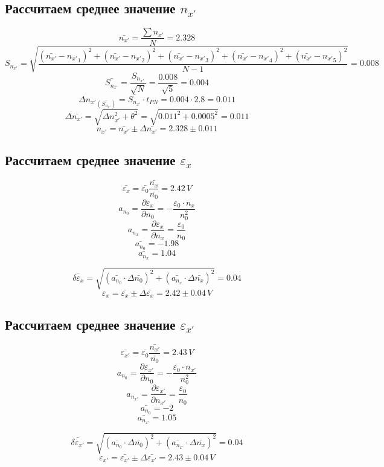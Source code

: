 \documentclass[a4paper,12pt]{report}
\begin{document}
\subsection*{Рассчитаем среднее значение $n_{x'}$}

\[ \bar{n_{x'}} = \frac{\sum n_{x'}}{N} = 2.328 \]
\[S_{n_{x'}}=\sqrt{\frac{(\bar{n_{x'}}-{n_{x'}}_1)^2+(\bar{n_{x'}}-{n_{x'}}_2)^2+(\bar{n_{x'}}-{n_{x'}}_3)^2+(\bar{n_{x'}}-{n_{x'}}_4)^2+(\bar{n_{x'}}-{n_{x'}}_5)^2}{N-1}} = 0.008\]
\[\bar{S_{n_{x'}}}=\frac{S_{n_{x'}}}{\sqrt{N}}=\frac{0.008}{\sqrt{5}}=0.004\]
\[ \Delta{n_{x'}}_{(\bar{S_{n_{x'}}})}=\bar{S_{n_{x'}}}\cdot t_{PN}=0.004\cdot 2.8=0.011 \]
\[ \Delta{\bar{n_{x'}}}=\sqrt{\Delta n_{x'}^2 + \theta^2}=\sqrt{0.011^2 + 0.0005^2}=0.011 \]
\[{n_{x'}}=\bar{n_{x'}}\pm \Delta{\bar{n_{x'}}}=2.328\pm 0.011\]

\subsection*{Рассчитаем среднее значение $\varepsilon_x$}

\[ \bar{\varepsilon_x} = \bar{\varepsilon_0} \frac{\bar{n_x}}{\bar{n_0}} = 2.42 \, V\]
\[ a_{n_0} = \frac{\partial \varepsilon_x}{\partial n_0} = -\frac{\varepsilon_0 \cdot n_x}{n_0^2}\]
\[ a_{n_x} = \frac{\partial \varepsilon_x}{\partial n_x} = \frac{\varepsilon_0}{n_0}\]
\[ \bar{a_{n_0}} = -1.98 \]
\[ \bar{a_{n_x}} = 1.04 \]

\[ \bar{\delta \varepsilon_x} = \sqrt{(\bar{a_{n_0}} \cdot \Delta{\bar{n_0}})^2+(\bar{a_{n_x}} \cdot \Delta{\bar{n_x}})^2} = 0.04\]
\[ \varepsilon_x=\bar{\varepsilon_x}\pm \Delta{\bar{\varepsilon_x}}= 2.42\pm 0.04 \, V \]

\subsection*{Рассчитаем среднее значение $\varepsilon_{x'}$}

\[ \bar{\varepsilon_{x'}} = \bar{\varepsilon_0} \frac{\bar{n_{x'}}}{\bar{n_0}} = 2.43 \, V\]
\[ a_{n_0} = \frac{\partial \varepsilon_{x'}}{\partial n_0} = -\frac{\varepsilon_0 \cdot n_{x'}}{n_0^2}\]
\[ a_{n_{x'}} = \frac{\partial \varepsilon_{x'}}{\partial n_{x'}} = \frac{\varepsilon_0}{n_0}\]
\[ \bar{a_{n_0}} = -2 \]
\[ \bar{a_{n_{x'}}} = 1.05 \]

\[ \bar{\delta \varepsilon_{x'}} = \sqrt{(\bar{a_{n_0}} \cdot \Delta{\bar{n_0}})^2+(\bar{a_{n_{x'}}} \cdot \Delta{\bar{n_x}})^2} = 0.04\]
\[ \varepsilon_{x'}=\bar{\varepsilon_{x'}}\pm \Delta{\bar{\varepsilon_{x'}}}= 2.43\pm 0.04 \, V \]
 
\end{document}
